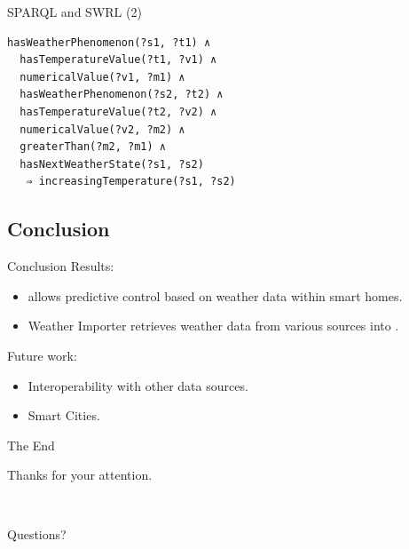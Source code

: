 \documentclass{beamer}
\begin{document}
\begin{frame}[fragile]{SPARQL and SWRL (2)}
	\begin{framed}
		\begin{verbatim}
hasWeatherPhenomenon(?s1, ?t1) ∧
  hasTemperatureValue(?t1, ?v1) ∧
  numericalValue(?v1, ?m1) ∧
  hasWeatherPhenomenon(?s2, ?t2) ∧
  hasTemperatureValue(?t2, ?v2) ∧
  numericalValue(?v2, ?m2) ∧
  greaterThan(?m2, ?m1) ∧
  hasNextWeatherState(?s1, ?s2)
   ⇒ increasingTemperature(?s1, ?s2)
		\end{verbatim}
	\end{framed}
\end{frame}

\subsection{Conclusion}

\begin{frame}{Conclusion}
	Results:
	\begin{itemize}
		\item \smarthomeweather allows predictive control based on weather data within smart homes.
		\item Weather Importer retrieves weather data from various sources into \smarthomeweather.
	\end{itemize}

	Future work:
	\begin{itemize}
		\item Interoperability with other data sources.
		\item Smart Cities.
	\end{itemize}
\end{frame}

\begin{frame}{The End}
	\begin{center}
		Thanks for your attention.

		~

		Questions?
	\end{center}
\end{frame}
\end{document}
